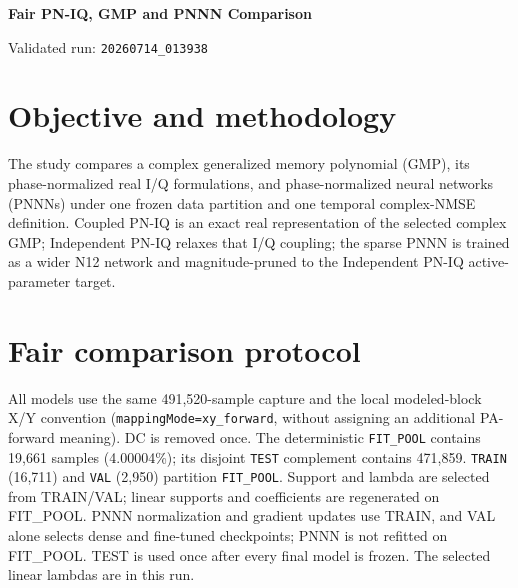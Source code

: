 \documentclass[9pt,a4paper]{extarticle}
\newcommand{\Hint}[2]{\pgfplotstablegetelem{#1}{#2}\of\HyperTable%
  \pgfmathprintnumber[fixed,precision=0]{\pgfplotsretval}}
\begin{document}
\begin{center}
  {\Large\bfseries Fair PN-IQ, GMP and PNNN Comparison}\par
  \vspace{2pt}
  {\normalsize Validated run: \texttt{20260714\_013938}}
\end{center}

\section*{Objective and methodology}
The study compares a complex generalized memory polynomial (GMP), its
phase-normalized real I/Q formulations, and phase-normalized neural networks
(PNNNs) under one frozen data partition and one temporal complex-NMSE
definition.  Coupled PN-IQ is an exact real representation of the selected
complex GMP; Independent PN-IQ relaxes that I/Q coupling; the sparse PNNN is
trained as a wider N12 network and magnitude-pruned to the Independent PN-IQ
active-parameter target.

\section*{Fair comparison protocol}
All models use the same 491,520-sample capture and the local modeled-block
X/Y convention (\texttt{mappingMode=xy\_forward}, without assigning an
additional PA-forward meaning).  DC is removed once.  The deterministic
\texttt{FIT\_POOL} contains 19,661 samples (4.00004\%); its disjoint
\texttt{TEST} complement contains 471,859.  \texttt{TRAIN} (16,711) and
\texttt{VAL} (2,950) partition \texttt{FIT\_POOL}.  Support and lambda are
selected from TRAIN/VAL; linear supports and coefficients are regenerated on
FIT\_POOL.  PNNN normalization and gradient updates use TRAIN, and VAL alone
selects dense and fine-tuned checkpoints; PNNN is not refitted on FIT\_POOL.
TEST is used once after every final model is frozen.  The selected linear
lambdas are \Hint{0}{SelectedLambda} in this run.
\end{document}
